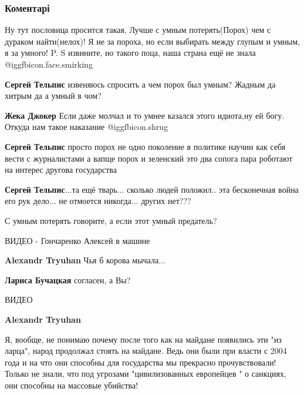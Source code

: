  
 
 
 
 
\subsubsection{Коментарі}
\label{sec:01_12_2021.fb.panchenko_diana.1.rodina_maidan.cmt}

\begin{itemize} %

Ну тут пословица просится такая, Лучше с умным потерять(Порох) чем с дураком
найти(нелох)! Я не за пороха, но если выбирать между глупым и умным, я за умного!
P. S извините, но такого поца, наша страна ещё не знала @igg{fbicon.face.smirking} 

\begin{itemize} %
\textbf{Сергей Тельпис} извеняюсь спросить а чем порох был умным? Жадным да хитрым да а умный в чом?

\textbf{Жека Джокер} Если даже молчал и то умнее казался этого идиота,ну ей богу. Откуда нам такое наказание @igg{fbicon.shrug} 

\textbf{Сергей Тельпис} просто порох не одно поколение в политике научин как себя вести с журналистами а вапще порох и зеленский это два сопога пара роботают на интерес другова государства

\textbf{Сергей Тельпис}...та ещё тварь... сколько людей положил.. эта бесконечная война его рук дело... не отмоется никогда... других нет???

С умным потерять говорите, а если этот умный предатель?

ВИДЕО - Гончаренко Алексей в машине

\textbf{Alexandr Tryuhan}
Чья б корова мычала...

\textbf{Лариса Бучацкая} согласен, а Вы?

ВИДЕО

\textbf{Alexandr Tryuhan}

Я, вообще, не понимаю почему после того как на майдане появились эти "из
ларца", народ продолжал стоять на майдане. Ведь они были при власти с 2004 года
и на что они способны для государства мы прекрасно прочувствовали! Только не
знали, что под угрозами "цивилизованных европейцев " о санкциях, они способны
на массовые убийства!



\end{itemize}
\end{itemize}
